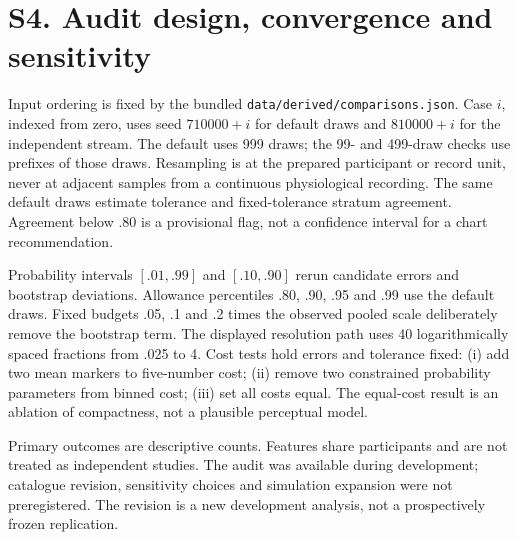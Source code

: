 \documentclass[10pt]{article}
\begin{document}
\section*{S4. Audit design, convergence and sensitivity}
Input ordering is fixed by the bundled \texttt{data/derived/comparisons.json}. Case $i$, indexed from zero, uses seed $710000+i$ for default draws and $810000+i$ for the independent stream. The default uses 999 draws; the 99- and 499-draw checks use prefixes of those draws. Resampling is at the prepared participant or record unit, never at adjacent samples from a continuous physiological recording. The same default draws estimate tolerance and fixed-tolerance stratum agreement. Agreement below .80 is a provisional flag, not a confidence interval for a chart recommendation.

Probability intervals $[.01,.99]$ and $[.10,.90]$ rerun candidate errors and bootstrap deviations. Allowance percentiles .80, .90, .95 and .99 use the default draws. Fixed budgets .05, .1 and .2 times the observed pooled scale deliberately remove the bootstrap term. The displayed resolution path uses 40 logarithmically spaced fractions from .025 to 4. Cost tests hold errors and tolerance fixed: (i) add two mean markers to five-number cost; (ii) remove two constrained probability parameters from binned cost; (iii) set all costs equal. The equal-cost result is an ablation of compactness, not a plausible perceptual model.

Primary outcomes are descriptive counts. Features share participants and are not treated as independent studies. The audit was available during development; catalogue revision, sensitivity choices and simulation expansion were not preregistered. The revision is a new development analysis, not a prospectively frozen replication.
\end{document}
